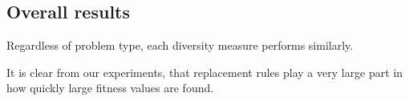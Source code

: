 



\subsection{Overall results}
Regardless of problem type, each diversity measure performs similarly.

It is clear from our experiments, that replacement rules play a very large part in how quickly large fitness values are found.
